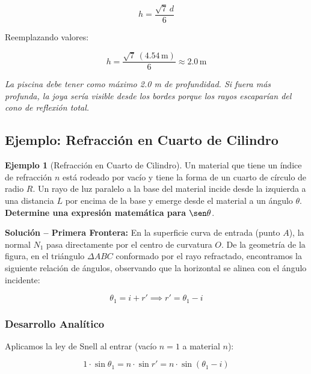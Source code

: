 \documentclass[12pt, a4paper]{article}
\theoremstyle{definition}
\newtheorem{ejemplo}{Ejemplo}[section]
\newcommand{\nota}[1]{\medskip\noindent\colorbox{grisclaro}{\parbox{0.95\linewidth}{\textit{#1}}}\medskip}
\begin{document}
\begin{equation}
  \boxed{h = \frac{\sqrt{7}\,d}{6}}
  \label{eq:h_joya}
\end{equation}

Reemplazando valores:

\begin{equation}
  h = \frac{\sqrt{7}\,(4.54\,\text{m})}{6} \approx 2.0\,\text{m}
  \label{eq:h_joya_valor}
\end{equation}

\nota{La piscina debe tener como máximo 2.0 m de profundidad. Si fuera más profunda, la joya
sería visible desde los bordes porque los rayos escaparían del cono de reflexión total.}

\subsection{Ejemplo: Refracción en Cuarto de Cilindro}
\label{sec:cuarto_cilindro}

\begin{ejemplo}[Refracción en Cuarto de Cilindro]
Un material que tiene un índice de refracción \(n\) está rodeado por vacío y tiene la forma de
un cuarto de círculo de radio \(R\). Un rayo de luz paralelo a la base del material incide desde
la izquierda a una distancia \(L\) por encima de la base y emerge desde el material a un ángulo
\(\theta\). \textbf{Determine una expresión matemática para \(\sen\theta\)}.
\end{ejemplo}

\textbf{Solución -- Primera Frontera:} En la superficie curva de entrada (punto \(A\)), la
normal \(N_1\) pasa directamente por el centro de curvatura \(O\). De la geometría de la figura,
en el triángulo \(\Delta ABC\) conformado por el rayo refractado, encontramos la siguiente
relación de ángulos, observando que la horizontal se alinea con el ángulo incidente:

\begin{equation}
  \theta_1 = i + r' \implies r' = \theta_1 - i
  \label{eq:primera_frontera}
\end{equation}

\subsubsection*{Desarrollo Analítico}

Aplicamos la ley de Snell al entrar (vacío \(n=1\) a material \(n\)):

\begin{equation}
  1\cdot\sin\theta_1 = n\cdot\sin r' = n\cdot\sin(\theta_1 - i)
  \label{eq:snell_entrada}
\end{equation}
\end{document}

